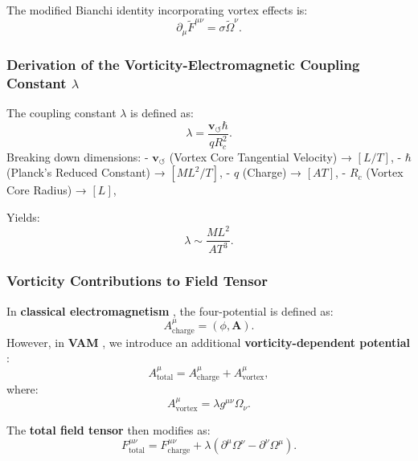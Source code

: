 The modified Bianchi identity incorporating vortex effects is:
\begin{equation*}
    \partial_\mu \tilde{F}^{\mu\nu} = \sigma \tilde{\Omega}^\nu.
\end{equation*}

\subsubsection*{Derivation of the Vorticity-Electromagnetic Coupling Constant \( \lambda \)}
The coupling constant \( \lambda \) is defined as:
\begin{equation*}
    \lambda = \frac{\mathbf{v}_{\scriptscriptstyle\boldsymbol{\circlearrowleft}} \hbar}{q R_c^2}.
\end{equation*}
Breaking down dimensions:
- \( \mathbf{v}_{\scriptscriptstyle\boldsymbol{\circlearrowleft}} \) (Vortex Core Tangential Velocity) → \( [L/T] \),
- \( \hbar \) (Planck's Reduced Constant) → \( [M L^2 / T] \),
- \( q \) (Charge) → \( [A T] \),
- \( R_c \) (Vortex Core Radius) → \( [L] \),

Yields:
\begin{equation*}
    \lambda \sim \frac{M L^2}{A T^3}.
\end{equation*}

\subsubsection*{Vorticity Contributions to Field Tensor}
In \textbf{classical electromagnetism} , the four-potential is defined as:
\begin{equation*}
    A^\mu_\text{charge} = \left( \phi, \mathbf{A} \right).
\end{equation*}
However, in \textbf{VAM} , we introduce an additional \textbf{vorticity-dependent potential} :
\begin{equation*}
    A^\mu_\text{total} = A^\mu_\text{charge} + A^\mu_\text{vortex},
\end{equation*}
where:
\begin{equation*}
    A^\mu_\text{vortex} = \lambda g^{\mu\nu} \Omega_\nu.
\end{equation*}

The \textbf{total field tensor}  then modifies as:
\begin{equation*}
    F^{\mu\nu}_\text{total} = F^{\mu\nu}_\text{charge} + \lambda (\partial^\mu \Omega^\nu - \partial^\nu \Omega^\mu).
\end{equation*}

